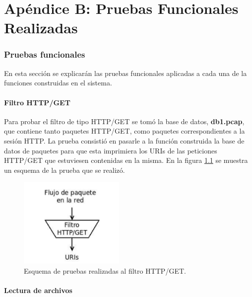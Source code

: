 \chapter{Apéndice B: Pruebas Funcionales Realizadas}
\label{apendiceB}

\subsection{Pruebas funcionales}

En esta sección se explicarán las pruebas funcionales aplicadas a cada
una de la funciones construidas en el sistema.

\subsubsection{Filtro HTTP/GET}

Para probar el filtro de tipo HTTP/GET se tomó la base de datos,
\textbf{db1.pcap}, que contiene tanto paquetes HTTP/GET, como paquetes correspondientes a la sesión HTTP. La prueba consistió en pasarle a la función construida la base de datos de paquetes para que esta imprimiera los URIs de las peticiones HTTP/GET que estuviesen contenidas en la misma. En la
figura \ref{fig:filtroHTTP} se muestra un esquema de la prueba que se realizó.

\begin{figure}[!htb]
\begin{center}
\includegraphics[width=2in]{./img/filtroHTTP.png}
\caption{Esquema de pruebas realizadas al filtro HTTP/GET.}
\label{fig:filtroHTTP}
\end{center}
\end{figure}

\subsubsection{Lectura de archivos}

